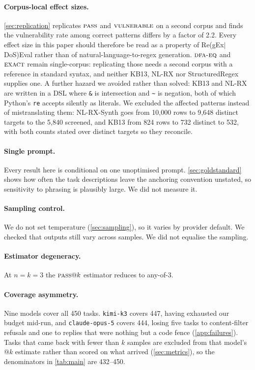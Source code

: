 \documentclass[11pt]{article}
\newcommand{\pass}{\textsc{pass}}
\newcommand{\vuln}{\textsc{vulnerable}}
\newcommand{\dfaeq}{\textsc{dfa-eq}}
\newcommand{\exact}{\textsc{exact}}
\begin{document}
\paragraph{Corpus-local effect sizes.} \cref{sec:replication} replicates
$\pass{}$ and $\vuln{}$ on a second corpus and finds the vulnerability rate
among correct patterns differs by a factor of 2.2. Every effect size in this
paper should therefore be read as a property of Re(gEx$|$DoS)Eval rather than
of natural-language-to-regex generation. $\dfaeq{}$ and $\exact{}$ remain
single-corpus: replicating those needs a second corpus with a reference in
standard syntax, and neither KB13, NL-RX nor StructuredRegex supplies one. A
further hazard we avoided
rather than solved: KB13 and NL-RX are written in a DSL where \texttt{\&} is
intersection and \texttt{\~{}} is negation, both of which Python's
\texttt{re} accepts silently as literals. We excluded the affected patterns instead of mistranslating them: NL-RX-Synth
goes from 10{,}000 rows to 9{,}648 distinct targets to the 5{,}840 screened,
and KB13 from 824 rows to 732 distinct to 532, with both counts stated over
distinct targets so they reconcile.

\paragraph{Single prompt.} Every result here is conditional on one
unoptimised prompt. \cref{sec:goldstandard} shows how often the task
descriptions leave the anchoring convention unstated, so sensitivity to
phrasing is plausibly large. We did not measure it.

\paragraph{Sampling control.} We do not set temperature
(\cref{sec:sampling}), so it varies by provider default. We checked that
outputs still vary across samples. We did not equalise the sampling.

\paragraph{Estimator degeneracy.} At $n=k=3$ the $\pass{}@k$ estimator
reduces to any-of-3.

\paragraph{Coverage asymmetry.} Nine models cover all 450 tasks.
\texttt{kimi-k3} covers 447, having exhausted our budget mid-run, and
\texttt{claude-opus-5} covers 444, losing five tasks to content-filter
refusals and one to replies that were nothing but a code fence
(\cref{app:failures}). Tasks that came back
with fewer than $k$ samples are excluded from that model's @$k$ estimate
rather than scored on what arrived (\cref{sec:metrics}), so the denominators
in \cref{tab:main} are 432--450.
\end{document}
